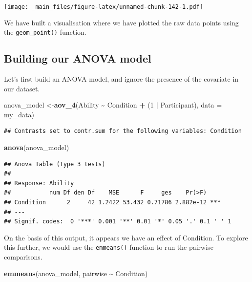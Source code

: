 \documentclass[
]{book}
\newenvironment{Shaded}{\begin{snugshade}}{\end{snugshade}}
\newcommand{\AttributeTok}[1]{\textcolor[rgb]{0.13,0.29,0.53}{#1}}
\newcommand{\DecValTok}[1]{\textcolor[rgb]{0.00,0.00,0.81}{#1}}
\newcommand{\FunctionTok}[1]{\textcolor[rgb]{0.13,0.29,0.53}{\textbf{#1}}}
\newcommand{\NormalTok}[1]{#1}
\newcommand{\OtherTok}[1]{\textcolor[rgb]{0.56,0.35,0.01}{#1}}
\newcommand{\SpecialCharTok}[1]{\textcolor[rgb]{0.81,0.36,0.00}{\textbf{#1}}}
\begin{document}
\texttt{[image: \_main\_files/figure-latex/unnamed-chunk-142-1.pdf]}

We have built a visualisation where we have plotted the raw data points using the \texttt{geom\_point()} function.

\hypertarget{building-our-anova-model-3}{%
\subsection{Building our ANOVA model}\label{building-our-anova-model-3}}

Let's first build an ANOVA model, and ignore the presence of the covariate in our dataset.

\begin{Shaded}
\begin{Highlighting}[]
\NormalTok{anova\_model }\OtherTok{\textless{}{-}}\FunctionTok{aov\_4}\NormalTok{(Ability }\SpecialCharTok{\textasciitilde{}}\NormalTok{ Condition }\SpecialCharTok{+}\NormalTok{ (}\DecValTok{1} \SpecialCharTok{|}\NormalTok{ Participant), }\AttributeTok{data =}\NormalTok{ my\_data)}
\end{Highlighting}
\end{Shaded}

\begin{verbatim}
## Contrasts set to contr.sum for the following variables: Condition
\end{verbatim}

\begin{Shaded}
\begin{Highlighting}[]
\FunctionTok{anova}\NormalTok{(anova\_model)}
\end{Highlighting}
\end{Shaded}

\begin{verbatim}
## Anova Table (Type 3 tests)
## 
## Response: Ability
##           num Df den Df    MSE      F     ges    Pr(>F)    
## Condition      2     42 1.2422 53.432 0.71786 2.882e-12 ***
## ---
## Signif. codes:  0 '***' 0.001 '**' 0.01 '*' 0.05 '.' 0.1 ' ' 1
\end{verbatim}

On the basis of this output, it appears we have an effect of Condition. To explore this further, we would use the \texttt{emmeans()} function to run the pairwise comparisons.

\begin{Shaded}
\begin{Highlighting}[]
\FunctionTok{emmeans}\NormalTok{(anova\_model, pairwise }\SpecialCharTok{\textasciitilde{}}\NormalTok{ Condition)}
\end{Highlighting}
\end{Shaded}
\end{document}
